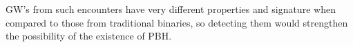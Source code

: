 GW's from such encounters have very different properties and signature when compared to those from traditional binaries, so detecting them would strengthen the possibility of the existence of PBH. \cite{Garc_a_Bellido_2017}














































































\pagebreak